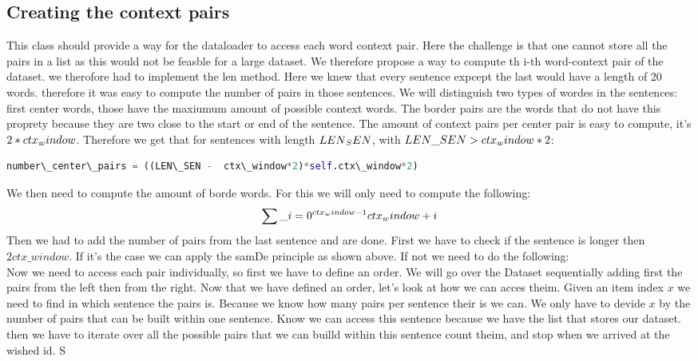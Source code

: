 \subsection{Creating the context pairs}
This class should provide a way for the dataloader to access each word context pair. Here the challenge is that one cannot store all the pairs in a list as this would not be feasble for a large dataset. We therefore propose a way to compute th i-th word-context pair of the dataset. we therofore had to implement the len method. Here we knew that every sentence expcept the last would have a length of 20 words. therefore it was easy to compute the number of pairs in those sentences.
We will distinguish two types of wordes in the sentences: first center words, those have the maxiumum amount of possible context words. The border pairs are the words that do not have this proprety because they are two close to the start or end of the sentence. The amount of context pairs per center pair is easy to compute, it's $2*ctx\\_window$. Therefore we get that for sentences with length $LEN\\_SEN$, with $LEN\_SEN  > ctx\\_window*2$:
\begin{lstlisting}[language=python]
number\_center\_pairs = ((LEN\_SEN -  ctx\_window*2)*self.ctx\_window*2)
\end{lstlisting}
We then need to compute the amount of borde words. For this we will only need to compute the following:
\begin{equation}
\sum\_{i=0}^{ctx\\_window -1} ctx\\_window + i
\end{equation}
 Then we had to add the number of pairs from the last sentence and are done. First  we have to check if the sentence is longer then $2 ctx\_window$. 
 If it's the case we can apply the samDe principle as shown above. If not we need to do the following:\\
Now we need to access each pair individually, so first we have to define an order. We will go over the Dataset sequentially adding first the pairs from the left then from the right. Now that we have defined an order, let's look at how we can acces theim. Given an item index $x$ we need to find in which sentence the pairs is. Because we know how many pairs per sentence their is we can. We only have to devide $x$ by the number of pairs that can be built within one sentence. Know we can access this sentence because we have the list that stores our dataset. then we have to iterate over all the possible pairs that we can builld within this sentence count theim, and stop when we arrived at the wished id. S

